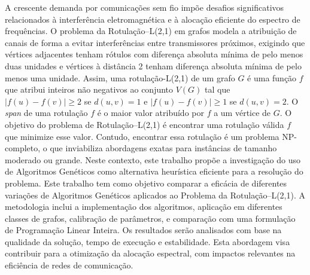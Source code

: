 A crescente demanda por comunicações sem fio impõe desafios significativos relacionados à interferência eletromagnética e à alocação eficiente do espectro de frequências. O problema da Rotulação–L(2,1) em grafos modela a atribuição de canais de forma a evitar interferências entre transmissores próximos, exigindo que vértices adjacentes tenham rótulos com diferença absoluta mínima de pelo menos duas unidades e vértices à distância 2 tenham diferença absoluta mínima de pelo menos uma unidade. Assim, uma rotulação-L(2,1) de um grafo $G$ é uma função $f$ que atribui inteiros não negativos ao conjunto $V(G)$ tal que $|f(u) - f(v)| \geq 2$ se $d(u, v) = 1$ e $|f(u) - f(v)| \geq 1$ se $d(u, v) = 2$. O \textit{span} de uma rotulação $f$ é o maior valor atribuído por $f$ a um vértice de $G$. O objetivo do problema de Rotulação–L(2,1) é encontrar uma rotulação válida $f$ que minimize esse valor. Contudo, encontrar essa rotulação é um problema NP-completo, o que inviabiliza abordagens exatas para instâncias de tamanho moderado ou grande. Neste contexto, este trabalho propõe a investigação do uso de Algoritmos Genéticos como alternativa heurística eficiente para a resolução do problema. Este trabalho tem como objetivo comparar a eficácia de diferentes variações de Algoritmos Genéticos aplicados ao Problema da Rotulação–L(2,1). A metodologia inclui a implementação dos algoritmos, aplicação em diferentes classes de grafos, calibração de parâmetros, e comparação com uma formulação de Programação Linear Inteira. Os resultados serão analisados com base na qualidade da solução, tempo de execução e estabilidade. Esta abordagem visa contribuir para a otimização da alocação espectral, com impactos relevantes na eficiência de redes de comunicação.

